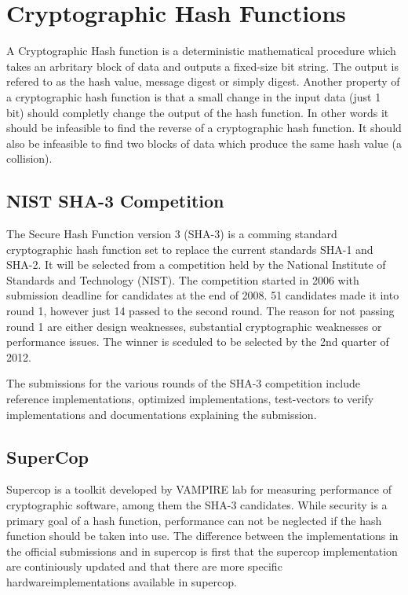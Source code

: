 \documentclass[english,12pt,a4paper]{book}
\begin{document}
\section{Cryptographic Hash Functions}
A Cryptographic Hash function is a deterministic mathematical procedure which
takes an arbritary block of data and outputs a fixed-size bit string. The
output is refered to as the hash value, message digest or simply digest.
Another property of a cryptographic hash function is that a small change in the
input data (just 1 bit) should completly change the output of the hash
function. In other words it should be infeasible to find the reverse of a
cryptographic hash function. It should also be infeasible to find two blocks of
data which produce the same hash value (a collision).

\subsection{NIST SHA-3 Competition}
The Secure Hash Function version 3 (SHA-3) is a comming standard cryptographic
hash function set to replace the current standards SHA-1 and SHA-2.
It will be selected from a competition held by the National
Institute of Standards and Technology (NIST). The competition started in 2006
with submission deadline for candidates at the end of 2008. 51 candidates made
it into round 1, however just 14 passed to the second round. The reason for not
passing round 1 are either design weaknesses, substantial cryptographic
weaknesses or performance issues. The winner is sceduled to be selected by the 
2nd quarter of 2012.

The submissions for the various rounds of the SHA-3 competition include
reference implementations, optimized implementations, test-vectors to verify
implementations and documentations explaining the submission.

\subsection{SuperCop}
Supercop is a toolkit developed by VAMPIRE lab for measuring performance of
cryptographic software, among them the SHA-3 candidates. While security is a
primary goal of a hash function, performance can not be neglected if the hash
function should be taken into use. The difference between the implementations
in the official submissions and in supercop is first that the supercop
implementation are continiously updated and that there are more specific
hardwareimplementations available in supercop.
\end{document}
